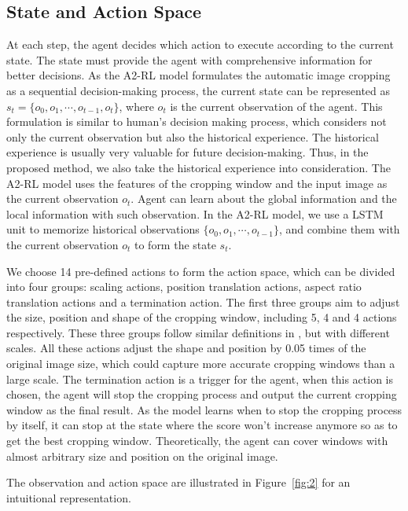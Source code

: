\documentclass[10pt,twocolumn,letterpaper]{article}
\begin{document}
\subsection{State and Action Space}
At each step, the agent decides which action to execute according to the current state. The state must provide the agent with comprehensive information for better decisions. As the A2-RL model formulates the automatic image cropping as a sequential decision-making process, the current state can be represented as $s_t=\{o_0,o_1,\cdots,o_{t-1},o_t\}$, where $o_t$ is the current observation of the agent. This formulation is similar to human's decision making process, which considers not only the current observation but also the historical experience. The historical experience is usually very valuable for future decision-making. Thus, in the proposed method, we also take the historical experience into consideration. The A2-RL model uses the features of the cropping window and the input image as the current observation $o_t$. Agent can learn about the global information and the local information with such observation. In the A2-RL model, we use a LSTM unit to memorize historical observations $\{o_0,o_1,\cdots,o_{t-1}\}$, and combine them with the current observation $o_t$ to form the state $s_t$.

We choose 14 pre-defined actions to form the action space, which can be divided into four groups: scaling actions, position translation actions, aspect ratio translation actions and a termination action. The first three groups aim to adjust the size, position and shape of the cropping window, including 5, 4 and 4 actions respectively. These three groups follow similar definitions in \cite{jie2016tree}, but with different scales. All these actions adjust the shape and position by 0.05 times of the original image size, which could capture more accurate cropping windows than a large scale. The termination action is a trigger for the agent, when this action is chosen, the agent will stop the cropping process and output the current cropping window as the final result. As the model learns when to stop the cropping process by itself, it can stop at the state where the score won't increase anymore so as to get the best cropping window. Theoretically, the agent can cover windows with almost arbitrary size and position on the original image.

The observation and action space are illustrated in Figure~\ref{fig:2} for an intuitional representation.
\end{document}
